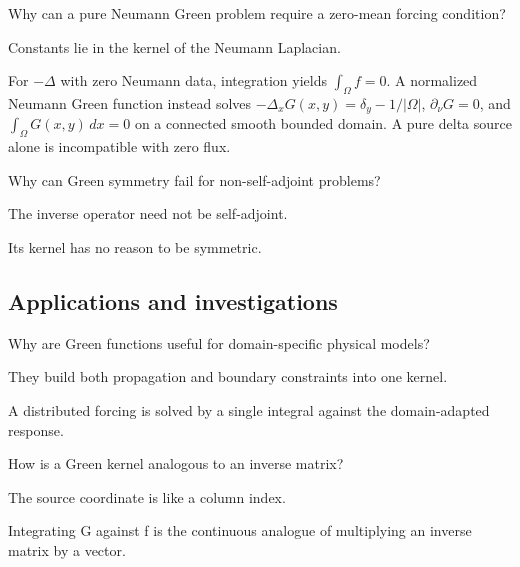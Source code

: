 \begin{exercise}\label{exr:iii25-expand-11}
Why can a pure Neumann Green problem require a zero-mean forcing condition?
\end{exercise}
\begin{hint}
Constants lie in the kernel of the Neumann Laplacian.
\end{hint}
\begin{solution}
For $-\Delta$ with zero Neumann data, integration yields $\int_\Omega f=0$. A normalized Neumann Green function instead solves $-\Delta_xG(x,y)=\delta_y-1/|\Omega|$, $\partial_\nu G=0$, and $\int_\Omega G(x,y)\,dx=0$ on a connected smooth bounded domain. A pure delta source alone is incompatible with zero flux.
\end{solution}

\begin{exercise}\label{exr:iii25-expand-12}
Why can Green symmetry fail for non-self-adjoint problems?
\end{exercise}
\begin{hint}
The inverse operator need not be self-adjoint.
\end{hint}
\begin{solution}
Its kernel has no reason to be symmetric.
\end{solution}

\subsection*{Applications and investigations}

\begin{exercise}\label{exr:iii25-expand-13}
Why are Green functions useful for domain-specific physical models?
\end{exercise}
\begin{hint}
They build both propagation and boundary constraints into one kernel.
\end{hint}
\begin{solution}
A distributed forcing is solved by a single integral against the domain-adapted response.
\end{solution}

\begin{exercise}\label{exr:iii25-expand-14}
How is a Green kernel analogous to an inverse matrix?
\end{exercise}
\begin{hint}
The source coordinate is like a column index.
\end{hint}
\begin{solution}
Integrating G against f is the continuous analogue of multiplying an inverse matrix by a vector.
\end{solution}

